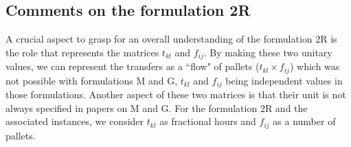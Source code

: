 \documentclass[preprint,12pt,authoryear]{elsarticle}
\begin{document}
\subsection{Comments on the formulation 2R}

\label{sec:2.5.2}

A crucial aspect to grasp for an overall understanding of the formulation 2R is the role that represents the matrices $t_{kl}$ and $f_{ij}$. By making these two unitary values, we can represent the transfers as a ``flow" of pallets ($t_{kl} \times f_{ij}$) which was not possible with formulations M and G, $t_{kl} $ and $f_{ij}$ being independent values in those formulations. Another aspect of these two matrices is that their unit is not always specified in papers on M and G. For the formulation 2R and the associated instances, we consider $t_{kl}$ as fractional hours and $f_{ij}$ as a number of pallets.





 
\newpage    
%
%
\end{document}
